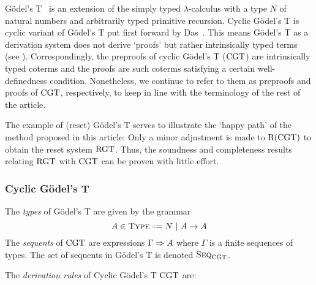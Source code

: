 Gödel's T~\parencite{godelUberBisherNoch1958} is an extension of the simply
typed $\lambda$-calculus with a type $N$ of natural numbers and arbitrarily
typed primitive recursion.
Cyclic Gödel's T is cyclic variant of Gödel's T put first forward by
Das~\parencite{dasCircularVersionGodel2021}.
This means Gödel's T as a derivation system does not
derive `proofs' but rather intrinsically typed terms (see \parencite[Chapter
15]{reynoldsTheoriesProgrammingLanguages1998}).
Correspondingly, the preproofs of cyclic Gödel's T ($\CGT$) are intrinsically
typed coterms and the proofs are such coterms satisfying a certain
well-definedness condition. Nonetheless, we continue to refer to them as
preproofs and proofs of $\CGT$, respectively, to keep in line with the
terminology of the rest of the article.

The example of (reset) Gödel's T serves to illustrate the `happy path' of the
method proposed in this article: Only a minor adjustment is made to $\Rrr(\CGT)$ to
obtain the reset system $\RGT$. Thus, the soundness and completeness results
relating $\RGT$ with $\CGT$ can be proven with little effort.

\subsubsection{Cyclic Gödel's T}
\label{sec:cyclic-godel}

The \emph{types} of Gödel's T are given by the grammar
\[A \in \type \langeq N ~|~ A \to A\] The \emph{sequents} of $\CGT$ are
expressions $\Gamma \sdash A$ where $\Gamma$ is a finite sequences of types. The
set of sequents in Gödel's T is denoted \( \Seq_\CGT \).

\begin{definition}
  The \emph{derivation rules} of Cyclic Gödel's T $\CGT$ are:
  \begin{mathpar}









  \end{mathpar}
\end{definition}

